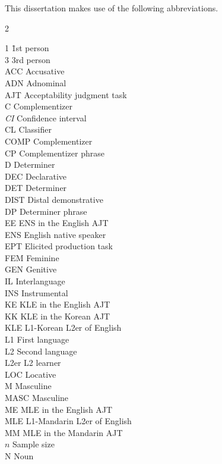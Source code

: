 \noindent This dissertation makes use of the following abbreviations.

\begin{multicols}{2}
\begin{tabbing}
1 \hspace{1.5cm} \= 1st person \\
3 \> 3rd person \\
ACC \> Accusative \\
ADN \> Adnominal \\
AJT \> Acceptability judgment task \\
C \> Complementizer \\
\textit{CI} \> Confidence interval \\
CL \> Classifier \\
COMP \> Complementizer \\
CP \> Complementizer phrase \\
D \> Determiner \\
DEC \> Declarative \\
DET \> Determiner \\
DIST \> Distal demonstrative \\
DP \> Determiner phrase \\
EE \> ENS in the English AJT \\
ENS \> English native speaker \\
EPT \> Elicited production task \\
FEM \> Feminine \\
GEN \> Genitive \\
IL \> Interlanguage \\
INS \> Instrumental \\
KE \> KLE in the English AJT \\
KK \> KLE in the Korean AJT \\
KLE \> L1-Korean L2er of English \\
L1 \> First language \\
L2 \> Second language \\
L2er \> L2 learner \\
LOC \> Locative \\
M \> Masculine \\
MASC \> Masculine \\
ME \> MLE in the English AJT \\
MLE \> L1-Mandarin L2er of English \\
MM \> MLE in the Mandarin AJT \\
$n$ \> Sample size \\
N \> Noun \\

\end{tabbing}
\end{multicols}
